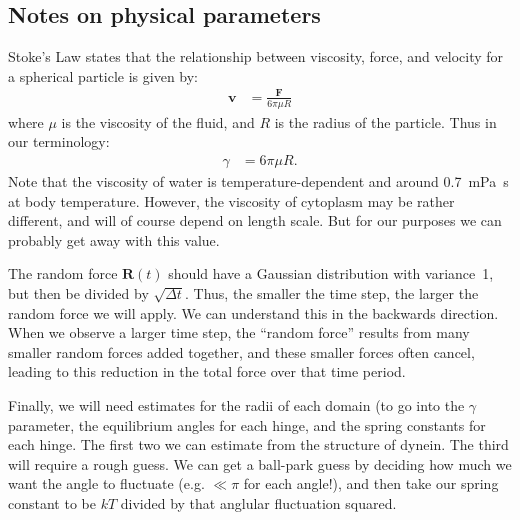 \documentclass[11pt, landscape]{article}
\begin{document}
\begin{twocolumn}
\section{Notes on physical parameters}

Stoke's Law states that the relationship between viscosity, force, and
velocity for a spherical particle is given by:
\begin{align}
  \mathbf{v} &= \frac{\mathbf{F}}{6\pi \mu R}
\end{align}
where $\mu$ is the viscosity of the fluid, and $R$ is the radius of
the particle.  Thus in our terminology:
\begin{align}
  \gamma &= 6\pi \mu R.
\end{align}
Note that the viscosity of water is temperature-dependent and around
0.7~mPa~s at body temperature.  However, the viscosity of cytoplasm
may be rather different, and will of course depend on length scale.
But for our purposes we can probably get away with this value.

The random force $\mathbf{R}(t)$ should have a Gaussian distribution
with variance~1, but then be divided by $\sqrt{\Delta t}$.  Thus, the
smaller the time step, the larger the random force we will apply.  We
can understand this in the backwards direction.  When we observe a
larger time step, the ``random force'' results from many smaller
random forces added together, and these smaller forces often cancel,
leading to this reduction in the total force over that time period.

Finally, we will need estimates for the radii of each domain (to go
into the $\gamma$ parameter, the equilibrium angles for each hinge, and
the spring constants for each hinge.  The first two we can estimate
from the structure of dynein.  The third will require a rough guess.
We can get a ball-park guess by deciding how much we want the angle to
fluctuate (e.g. $\ll \pi$ for each angle!), and then take our spring
constant to be $kT$ divided by that anglular fluctuation squared.

\end{twocolumn}
\end{document}

